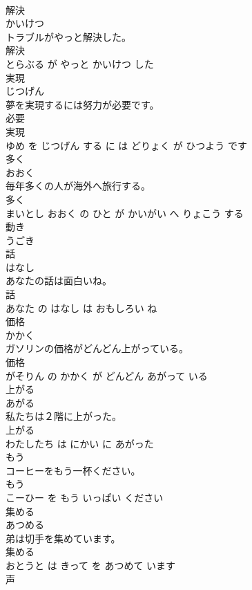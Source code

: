 \documentclass[8pt]{extreport}
\begin{document}
\begin{CJK}{UTF8}{min}
\\	解決	
\\	かいけつ			
\\	トラブルがやっと解決した。	
\\	解決 
\\	とらぶる が やっと かいけつ した			
\\	実現	
\\	じつげん			
\\	夢を実現するには努力が必要です。	
\\	必要 
\\	実現 
\\	ゆめ を じつげん する に は どりょく が ひつよう です			
\\	多く	
\\	おおく			
\\	毎年多くの人が海外へ旅行する。	
\\	多く 
\\	まいとし おおく の ひと が かいがい へ りょこう する			
\\	動き	
\\	うごき			
\\	話	
\\	はなし			
\\	あなたの話は面白いね。	
\\	話 
\\	あなた の はなし は おもしろい ね			
\\	価格	
\\	かかく			
\\	ガソリンの価格がどんどん上がっている。	
\\	価格 
\\	がそりん の かかく が どんどん あがって いる			
\\	上がる	
\\	あがる			
\\	私たちは２階に上がった。	
\\	上がる 
\\	わたしたち は にかい に あがった			
\\	もう	
\\	コーヒーをもう一杯ください。	
\\	もう 
\\	こーひー を もう いっぱい ください			
\\	集める	
\\	あつめる			
\\	弟は切手を集めています。	
\\	集める 
\\	おとうと は きって を あつめて います			
\\	声	

\end{CJK}
\end{document}
